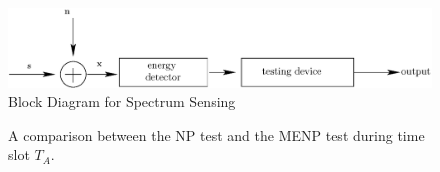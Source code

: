 \documentclass[12pt,journal,a4paper,twoside,onecolumn]{IEEEtran}
\begin{document}
\begin{spacing}{2}
\begin{figure}[!hbp]
\centering
\includegraphics[width = \textwidth]{4/fig4.eps}
\caption{Block Diagram for Spectrum Sensing}
\label{pic: block diagram}
\end{figure}

\begin{figure}[!h]
           \begin{floatrow}
       {\caption{A comparison between the NP test and the MENP test during time slot $T_A$.}
      \label{pic:20150702a0}
             }
             \ffigbox{
}
\end{floatrow}
\end{figure}
\end{spacing}
\end{document}
